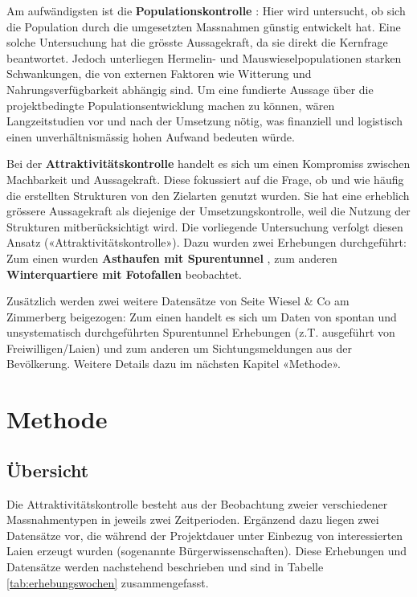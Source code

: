 \documentclass[
  oneside]{scrbook}
\begin{document}
Am aufwändigsten ist die \textbf{Populationskontrolle} : Hier wird untersucht, ob sich die Population durch die umgesetzten Massnahmen günstig entwickelt hat. Eine solche Untersuchung hat die grösste Aussagekraft, da sie direkt die Kernfrage beantwortet. Jedoch unterliegen Hermelin- und Mauswieselpopulationen starken Schwankungen, die von externen Faktoren wie Witterung und Nahrungsverfügbarkeit abhängig sind. Um eine fundierte Aussage über die projektbedingte Populationsentwicklung machen zu können, wären Langzeitstudien vor und nach der Umsetzung nötig, was finanziell und logistisch einen unverhältnismässig hohen Aufwand bedeuten würde.

Bei der \textbf{Attraktivitätskontrolle} handelt es sich um einen Kompromiss zwischen Machbarkeit und Aussagekraft. Diese fokussiert auf die Frage, ob und wie häufig die erstellten Strukturen von den Zielarten genutzt wurden. Sie hat eine erheblich grössere Aussagekraft als diejenige der Umsetzungskontrolle, weil die Nutzung der Strukturen mitberücksichtigt wird. Die vorliegende Untersuchung verfolgt diesen Ansatz («Attraktivitätskontrolle»). Dazu wurden zwei Erhebungen durchgeführt: Zum einen wurden \textbf{Asthaufen mit Spurentunnel} , zum anderen \textbf{Winterquartiere mit Fotofallen} beobachtet.

Zusätzlich werden zwei weitere Datensätze von Seite Wiesel \& Co am Zimmerberg beigezogen: Zum einen handelt es sich um Daten von spontan und unsystematisch durchgeführten Spurentunnel Erhebungen (z.T. ausgeführt von Freiwilligen/Laien) und zum anderen um Sichtungsmeldungen aus der Bevölkerung. Weitere Details dazu im nächsten Kapitel «Methode».

\hypertarget{methode}{%
\chapter{Methode}\label{methode}}

\hypertarget{uxfcbersicht}{%
\section{Übersicht}\label{uxfcbersicht}}

Die Attraktivitätskontrolle besteht aus der Beobachtung zweier verschiedener Massnahmentypen in jeweils zwei Zeitperioden. Ergänzend dazu liegen zwei Datensätze vor, die während der Projektdauer unter Einbezug von interessierten Laien erzeugt wurden (sogenannte Bürgerwissenschaften). Diese Erhebungen und Datensätze werden nachstehend beschrieben und sind in Tabelle \ref{tab:erhebungswochen} zusammengefasst.
\end{document}
